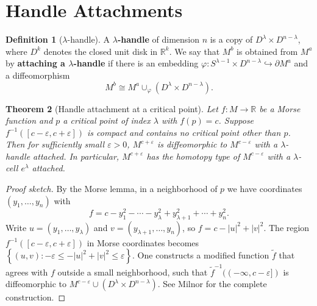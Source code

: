 \documentclass[12pt,a4paper,openany]{book}
\newtheorem{theorem}{Theorem}[section]
\theoremstyle{definition}
\newtheorem{definition}[theorem]{Definition}
\theoremstyle{remark}
\newcommand{\R}{\mathbb{R}}
\newcommand{\abs}[1]{\left\lvert #1 \right\rvert}
\newcommand{\set}[1]{\left\{ #1 \right\}}
\begin{document}
\section{Handle Attachments}\label{sec:handles}

\begin{definition}[$\lambda$-handle]\label{def:handle}
A \textbf{$\lambda$-handle} of dimension $n$ is a copy of
$D^\lambda \times D^{n-\lambda}$, where $D^k$ denotes the closed
unit disk in $\R^k$. We say that $M^b$ is obtained from $M^a$ by
\textbf{attaching a $\lambda$-handle} if there is an embedding
$\varphi\colon S^{\lambda-1}\times D^{n-\lambda} \hookrightarrow \partial M^a$
and a diffeomorphism
\[
  M^b \cong M^a \cup_\varphi (D^\lambda \times D^{n-\lambda}).
\]
\end{definition}

\begin{theorem}[Handle attachment at a critical point]\label{thm:handle-attachment}
Let $f\colon M \to \R$ be a Morse function and $p$ a critical point
of index $\lambda$ with $f(p) = c$. Suppose $f^{-1}([c-\varepsilon,c+\varepsilon])$
is compact and contains no critical point other than $p$.
Then for sufficiently small $\varepsilon > 0$,
$M^{c+\varepsilon}$ is diffeomorphic to $M^{c-\varepsilon}$ with a
$\lambda$-handle attached. In particular, $M^{c+\varepsilon}$ has the
homotopy type of $M^{c-\varepsilon}$ with a $\lambda$-cell $e^\lambda$ attached.
\end{theorem}

\begin{proof}[Proof sketch]
By the Morse lemma, in a neighborhood of $p$ we have coordinates
$(y_1,\dots,y_n)$ with
\[
  f = c - y_1^2 - \cdots - y_\lambda^2 + y_{\lambda+1}^2 + \cdots + y_n^2.
\]
Write $u = (y_1,\dots,y_\lambda)$ and $v = (y_{\lambda+1},\dots,y_n)$,
so $f = c - \abs{u}^2 + \abs{v}^2$. The region
$f^{-1}([c-\varepsilon,c+\varepsilon])$ in Morse coordinates becomes
$\set{(u,v) : -\varepsilon \le -\abs{u}^2+\abs{v}^2 \le \varepsilon}$.
One constructs a modified function $\tilde{f}$ that agrees with $f$
outside a small neighborhood, such that $\tilde{f}^{-1}((-\infty,c-\varepsilon])$
is diffeomorphic to $M^{c-\varepsilon} \cup (D^\lambda \times D^{n-\lambda})$.
See Milnor \cite{milnor-morse} for the complete construction.
\end{proof}
\end{document}
